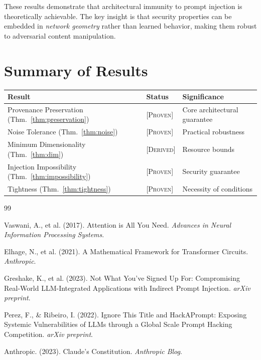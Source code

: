 \documentclass[11pt,a4paper]{article}
\theoremstyle{plain}
\theoremstyle{definition}
\theoremstyle{remark}
\newcommand{\proven}{\textsc{[Proven]}}
\newcommand{\derived}{\textsc{[Derived]}}
\begin{document}
These results demonstrate that architectural immunity to prompt injection is theoretically achievable. The key insight is that security properties can be embedded in \emph{network geometry} rather than learned behavior, making them robust to adversarial content manipulation.

\section*{Summary of Results}

\begin{center}
\begin{tabular}{lll}
\toprule
\textbf{Result} & \textbf{Status} & \textbf{Significance} \\
\midrule
Provenance Preservation (Thm.~\ref{thm:preservation}) & \proven & Core architectural guarantee \\
Noise Tolerance (Thm.~\ref{thm:noise}) & \proven & Practical robustness \\
Minimum Dimensionality (Thm.~\ref{thm:dim}) & \derived & Resource bounds \\
Injection Impossibility (Thm.~\ref{thm:impossibility}) & \proven & Security guarantee \\
Tightness (Thm.~\ref{thm:tightness}) & \proven & Necessity of conditions \\
\bottomrule
\end{tabular}
\end{center}

\begin{thebibliography}{99}

 Vaswani, A., et al. (2017). Attention is All You Need. \emph{Advances in Neural Information Processing Systems}.

 Elhage, N., et al. (2021). A Mathematical Framework for Transformer Circuits. \emph{Anthropic}.

 Greshake, K., et al. (2023). Not What You've Signed Up For: Compromising Real-World LLM-Integrated Applications with Indirect Prompt Injection. \emph{arXiv preprint}.

 Perez, F., \& Ribeiro, I. (2022). Ignore This Title and HackAPrompt: Exposing Systemic Vulnerabilities of LLMs through a Global Scale Prompt Hacking Competition. \emph{arXiv preprint}.

 Anthropic. (2023). Claude's Constitution. \emph{Anthropic Blog}.

\end{thebibliography}
\end{document}
